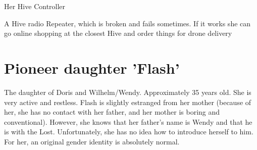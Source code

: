 \begin{npcBox}[title=Doris]
    \begin{stressSection}
    \end{stressSection}
    \begin{tabularx}{\textwidth}{ XX }
    \end{tabularx}

    \begin{consequences}
    \item {}
    \item {}
    \item {}
    \end{consequences}

    \begin{equipment}
    \item Her Hive Controller
    \item A Hive radio Repeater, which is broken and fails sometimes. If it works she can go online shopping at the closest Hive and order things for drone delivery
    \end{equipment}
\end{npcBox}
\newpage

\section{Pioneer daughter 'Flash'}

The daughter of Doris and Wilhelm/Wendy. Approximately 35 years old. She is very active and restless. Flash is slightly estranged from her mother (because of her, she has no contact with her father, and her mother is boring and conventional). However, she knows that her father's name is Wendy and that he is with the Lost. Unfortunately, she has no idea how to introduce herself to him. For her, an original gender identity is absolutely normal.

